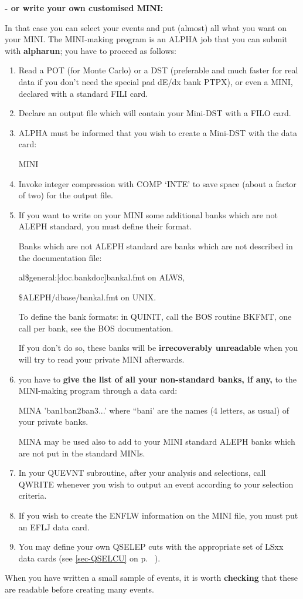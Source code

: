 {\bf - or write your own customised MINI:} 

In that case you can select your events and  put (almost) all what you want on your MINI. The MINI-making 
program is an ALPHA job that you can submit with {\bf alpharun}; you have to proceed as follows: 


\begin{enumerate}

\item Read a POT (for Monte Carlo) or a DST (preferable and much faster for real data if you don't need the special pad dE/dx bank 
PTPX), or even a MINI, declared with a standard FILI card.
\item Declare an output file which will contain your Mini-DST with
a FILO card.

\item ALPHA must be informed that you wish to create a Mini-DST with the data card:

 MINI 

\item Invoke integer compression with COMP `INTE' to save space (about a factor of
two) for the output file. 
 

\item 
If you want to write on your MINI some additional banks which are not ALEPH standard, you must define their format.

Banks which are not ALEPH standard are banks which are not described in the documentation file:

 al\$general:[doc.bankdoc]bankal.fmt on ALWS, 

\$ALEPH/dbase/bankal.fmt on UNIX.

To define the bank formats: in QUINIT, call the BOS routine BKFMT, one call per bank, see the BOS documentation.

If you don't do so, these banks will be {\bf irrecoverably unreadable} when you will try to read your private MINI
 afterwards.

\item
 you have to {\bf give the list of all your non-standard banks, if any,} to the MINI-making program through a data card:

MINA 'ban1ban2ban3...' where ``bani' are the names (4 letters, as usual) of your private banks.

   MINA may be used also to add to your MINI standard ALEPH banks which are not put in the standard MINIs. 

\item In your QUEVNT subroutine, after your analysis and selections, call QWRITE whenever you wish to output an event
according to your selection criteria.

\item If you wish to create the ENFLW  information on the MINI file,
 you must put an EFLJ data card.

\item You may define your own QSELEP cuts with the appropriate set of LSxx data cards (see \ref{sec-QSELCU} on p.
~\pageref{sec-QSELCU}).

\end{enumerate}
When you have written a small sample of events, it is worth {\bf checking}
that these are readable
before creating many events.
 
